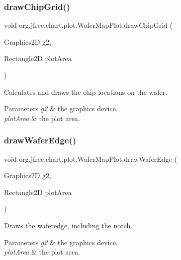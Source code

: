 \subsubsection{\texorpdfstring{draw\+Chip\+Grid()}{drawChipGrid()}}
{\footnotesize\ttfamily void org.\+jfree.\+chart.\+plot.\+Wafer\+Map\+Plot.\+draw\+Chip\+Grid (\begin{DoxyParamCaption}\item[{Graphics2D}]{g2,  }\item[{Rectangle2D}]{plot\+Area }\end{DoxyParamCaption})\hspace{0.3cm}{\ttfamily [protected]}}

Calculates and draws the chip locations on the wafer.


\begin{DoxyParams}{Parameters}
{\em g2} & the graphics device. \\
\hline
{\em plot\+Area} & the plot area. \\
\hline
\end{DoxyParams}
\mbox{\label{classorg_1_1jfree_1_1chart_1_1plot_1_1_wafer_map_plot_a2661812e9bce4c36f56708fd4a488282}} 
\subsubsection{\texorpdfstring{draw\+Wafer\+Edge()}{drawWaferEdge()}}
{\footnotesize\ttfamily void org.\+jfree.\+chart.\+plot.\+Wafer\+Map\+Plot.\+draw\+Wafer\+Edge (\begin{DoxyParamCaption}\item[{Graphics2D}]{g2,  }\item[{Rectangle2D}]{plot\+Area }\end{DoxyParamCaption})\hspace{0.3cm}{\ttfamily [protected]}}

Draws the waferedge, including the notch.


\begin{DoxyParams}{Parameters}
{\em g2} & the graphics device. \\
\hline
{\em plot\+Area} & the plot area. \\
\hline
\end{DoxyParams}
\mbox{\label{classorg_1_1jfree_1_1chart_1_1plot_1_1_wafer_map_plot_af2cc2b6bb169126d1c4c747da83d39ad}} 
